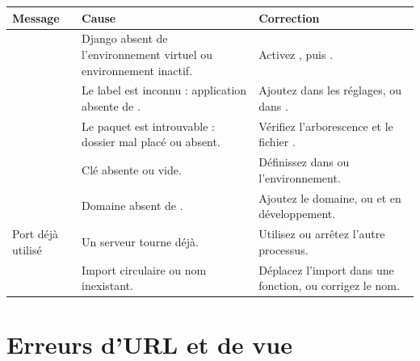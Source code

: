 \begin{longtable}{L{5.2cm} L{4.5cm} L{4.7cm}}
\toprule
\textbf{Message} & \textbf{Cause} & \textbf{Correction} \\
\midrule
\endhead
\footnotesize
{} & Django absent de l'environnement virtuel
ou environnement inactif. & Activez , puis
. \\
 & Le label  est inconnu :
application absente de . & Ajoutez
 dans les réglages, ou 
dans . \\
 & Le paquet  est
introuvable : dossier mal placé ou  absent. & Vérifiez l'arborescence et le fichier
. \\
 & Clé  absente ou vide. & Définissez
 dans  ou l'environnement. \\
 & Domaine absent de . & Ajoutez le
domaine, ou  et  en développement. \\
Port déjà utilisé & Un serveur tourne déjà. & Utilisez
 ou arrêtez l'autre processus. \\
 & Import circulaire ou nom  inexistant. &
Déplacez l'import dans une fonction, ou corrigez le nom. \\
\bottomrule
\end{longtable}

\section{Erreurs d'URL et de vue}

